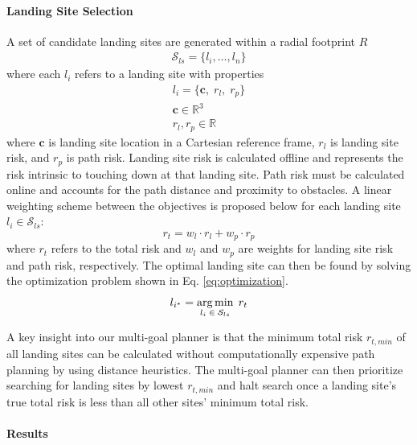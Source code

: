 \paragraph{Landing Site Selection}
A set of candidate landing sites are generated within a radial footprint $R$
\begin{align}
    \mathcal{S}_{ls} = \{ l_i, \ldots, l_n \}
\end{align}
where each $l_i$ refers to a landing site with properties
\begin{align}
    l_i = \{ \mathbf{c},\; r_{l}, \;r_{p} \} \\
    \mathbf{c} \in \mathbb{R}^3 \\
    r_{l}, r_{p}  \in \mathbb{R} %
\end{align}
where $\mathbf{c}$ is landing site location in a Cartesian reference frame, $r_{l}$ is landing site risk, and $r_{p}$ is path risk. Landing site risk is calculated offline and represents the risk intrinsic to touching down at that landing site. Path risk must be calculated online and accounts for the path distance and proximity to obstacles. A linear weighting scheme between the objectives is proposed below for each landing site $l_i \in \mathcal{S}_{ls} $:
\begin{equation}\label{eq:total_risk}
    r_{t} = w_l \cdot r_{l} + w_p \cdot r_{p}
\end{equation}
where $r_{t}$ refers to the total risk and $w_l$ and $w_p$ are weights for landing site risk and path risk, respectively. The optimal landing site can then be found by solving the optimization problem shown in Eq. \ref{eq:optimization}.
\begin{equation}
    l_{i^*} = \operatorname*{arg\,min}_{l_i \; \in \; \mathcal{S}_{ls}} \; r_{t}\label{eq:optimization}
\end{equation}

A key insight into our multi-goal planner is that the minimum total risk $r_{t,min}$ of all landing sites can be calculated without computationally expensive path planning by using distance heuristics. The multi-goal planner can then prioritize searching for landing sites by lowest $r_{t,min}$ and halt search once a landing site's true total risk is less than all other sites' minimum total risk. 

\paragraph{Results}

